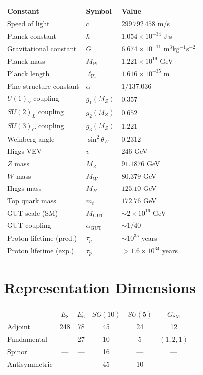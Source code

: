 \documentclass[11pt,a4paper,openright]{book}
\theoremstyle{plain}
\theoremstyle{definition}
\newcommand{\SM}{\mathrm{SM}}
\newcommand{\GUT}{\mathrm{GUT}}
\newcommand{\Pl}{\mathrm{Pl}}
\begin{document}
\begin{center}
\begin{tabular}{lll}
\toprule
\textbf{Constant} & \textbf{Symbol} & \textbf{Value} \\
\midrule
Speed of light & $c$ & $299\,792\,458$ m/s \\
Planck constant & $\hbar$ & $1.054 \times 10^{-34}$ J$\cdot$s \\
Gravitational constant & $G$ & $6.674 \times 10^{-11}$ m$^3$kg$^{-1}$s$^{-2}$ \\
Planck mass & $M_{\Pl}$ & $1.221 \times 10^{19}$ GeV \\
Planck length & $\ell_{\Pl}$ & $1.616 \times 10^{-35}$ m \\
\midrule
Fine structure constant & $\alpha$ & $1/137.036$ \\
$U(1)_Y$ coupling & $g_1(M_Z)$ & $0.357$ \\
$SU(2)_L$ coupling & $g_2(M_Z)$ & $0.652$ \\
$SU(3)_C$ coupling & $g_3(M_Z)$ & $1.221$ \\
Weinberg angle & $\sin^2\theta_W$ & $0.2312$ \\
\midrule
Higgs VEV & $v$ & $246$ GeV \\
$Z$ mass & $M_Z$ & $91.1876$ GeV \\
$W$ mass & $M_W$ & $80.379$ GeV \\
Higgs mass & $M_H$ & $125.10$ GeV \\
Top quark mass & $m_t$ & $172.76$ GeV \\
\midrule
GUT scale (SM) & $M_{\GUT}$ & $\sim 2 \times 10^{16}$ GeV \\
GUT coupling & $\alpha_{\GUT}$ & $\sim 1/40$ \\
Proton lifetime (pred.) & $\tau_p$ & $\sim 10^{35}$ years \\
Proton lifetime (exp.) & $\tau_p$ & $> 1.6 \times 10^{34}$ years \\
\bottomrule
\end{tabular}
\end{center}

\section{Representation Dimensions}

\begin{center}
\begin{tabular}{lccccc}
\toprule
& $E_8$ & $E_6$ & $SO(10)$ & $SU(5)$ & $G_{\SM}$ \\
\midrule
Adjoint & 248 & 78 & 45 & 24 & 12 \\
Fundamental & --- & 27 & 10 & 5 & $(1,2,1)$ \\
Spinor & --- & --- & 16 & --- & --- \\
Antisymmetric & --- & --- & 45 & 10 & --- \\
\bottomrule
\end{tabular}
\end{center}
\end{document}
